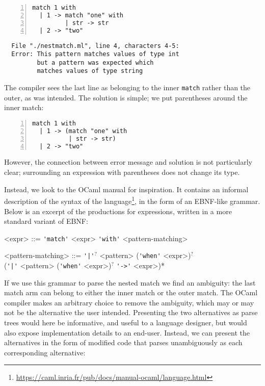 \documentclass[acmsmall,review,anonymous]{acmart}\settopmatter{printfolios=true,printccs=false,printacmref=false}
\newcommand{\ocaml}{\lstinline[language={[objective]caml}]}
\begin{document}
\begin{minipage}{.35\textwidth}
\begin{lstlisting}[language={[objective]caml},numbers=left]
match 1 with
  | 1 -> match "one" with
         | str -> str
  | 2 -> "two"
\end{lstlisting}
\end{minipage}
\vrule
\begin{minipage}{\textwidth}
\begin{lstlisting}
  File "./nestmatch.ml", line 4, characters 4-5:
  Error: This pattern matches values of type int
         but a pattern was expected which
         matches values of type string
\end{lstlisting}
\end{minipage}

\noindent The compiler sees the last line as belonging to the inner \ocaml{match} rather than the outer, as was intended. The solution is simple; we put parentheses around the inner match:

\begin{minipage}{\textwidth}
\begin{lstlisting}[language={[objective]caml},numbers=left]
match 1 with
  | 1 -> (match "one" with
          | str -> str)
  | 2 -> "two"
\end{lstlisting}
\end{minipage}

\noindent However, the connection between error message and solution is not particularly clear; surrounding an expression with parentheses does not change its type.

Instead, we look to the OCaml manual for inspiration. It contains an informal description of the syntax of the language\footnote{\url{https://caml.inria.fr/pub/docs/manual-ocaml/language.html}}, in the form of an EBNF-like grammar. Below is an excerpt of the productions for expressions, written in a more standard variant of EBNF:

\setlength{\grammarindent}{9.5em}
\begin{grammar}
<expr> ::= \verb|'match'| <expr> \verb|'with'| <pattern-matching>

<pattern-matching> ::= \verb{'|'{$^{?}$ <pattern> (\verb|'when'| <expr>)$^{?}$ \\
(\verb{'|'{ <pattern> (\verb|'when'| <expr>)$^{?}$ \verb|'->'| <expr>)*
\end{grammar}

\noindent If we use this grammar to parse the nested match we find an ambiguity: the last match arm can belong to either the inner match or the outer match. The OCaml compiler makes an arbitrary choice to remove the ambiguity, which may or may not be the alternative the user intended. Presenting the two alternatives as parse trees would here be informative, and useful to a language designer, but would also expose implementation details to an end-user. Instead, we can present the alternatives in the form of modified code that parses unambiguously as each corresponding alternative:
\end{document}
